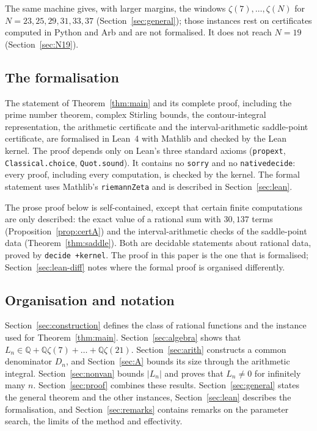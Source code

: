 \documentclass[11pt]{amsart}
\theoremstyle{definition}
\theoremstyle{remark}
\numberwithin{equation}{section}
\newcommand{\QQ}{\mathbb{Q}}
\newcommand{\lean}[1]{{\def\_{\textunderscore\allowbreak}\texttt{#1}}}
\begin{document}
The same machine gives, with larger margins, the windows $\zeta(7),\dots,\zeta(N)$ for $N=23,25,29,31,33,37$
(Section~\ref{sec:general}); those instances rest on certificates computed in Python and Arb and are not
formalised. It does not reach $N=19$ (Section~\ref{sec:N19}).

\subsection{The formalisation}
The statement of Theorem~\ref{thm:main} and its complete proof, including the prime number theorem, complex
Stirling bounds, the contour-integral representation, the arithmetic certificate and the interval-arithmetic
saddle-point certificate, are formalised in Lean~4 with Mathlib and checked by the Lean kernel. The proof
depends only on Lean's three standard axioms (\lean{propext}, \lean{Classical.choice}, \lean{Quot.sound}). It
contains no \lean{sorry} and no \lean{native\_decide}: every proof, including every computation, is checked by
the kernel. The formal statement uses Mathlib's \lean{riemannZeta} and is described in Section~\ref{sec:lean}.

The prose proof below is self-contained, except that certain finite computations are only described: the exact
value of a rational sum with $30{,}137$ terms (Proposition~\ref{prop:certA}) and the interval-arithmetic checks of
the saddle-point data (Theorem~\ref{thm:saddle}). Both are decidable statements about rational data, proved by
\lean{decide +kernel}. The proof in this paper is the one that is formalised; Section~\ref{sec:lean-diff} notes
where the formal proof is organised differently.

\subsection{Organisation and notation}
Section~\ref{sec:construction} defines the class of rational functions and the instance used for
Theorem~\ref{thm:main}. Section~\ref{sec:algebra} shows that $L_n\in\QQ+\QQ\zeta(7)+\dots+\QQ\zeta(21)$.
Section~\ref{sec:arith} constructs a common denominator $D_n$, and Section~\ref{sec:A} bounds its size through
the arithmetic integral. Section~\ref{sec:nonvan} bounds $|L_n|$ and proves that $L_n\ne0$ for infinitely many
$n$. Section~\ref{sec:proof} combines these results. Section~\ref{sec:general} states the general theorem and the
other instances, Section~\ref{sec:lean} describes the formalisation, and Section~\ref{sec:remarks} contains
remarks on the parameter search, the limits of the method and effectivity.
\end{document}
